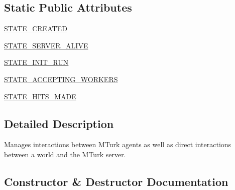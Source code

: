 \subsection*{Static Public Attributes}
\begin{DoxyCompactItemize}
\item 
\hyperlink{classparlai_1_1mturk_1_1core_1_1dev_1_1mturk__manager_1_1MTurkManager_a0f7a896e395e0201436504a28c3b2c59}{S\+T\+A\+T\+E\+\_\+\+C\+R\+E\+A\+T\+ED}
\item 
\hyperlink{classparlai_1_1mturk_1_1core_1_1dev_1_1mturk__manager_1_1MTurkManager_a3b27b3e98f420814dc7ef248839c053c}{S\+T\+A\+T\+E\+\_\+\+S\+E\+R\+V\+E\+R\+\_\+\+A\+L\+I\+VE}
\item 
\hyperlink{classparlai_1_1mturk_1_1core_1_1dev_1_1mturk__manager_1_1MTurkManager_a0e6f65be04d9a7cda6f58aa9fcbfc5f7}{S\+T\+A\+T\+E\+\_\+\+I\+N\+I\+T\+\_\+\+R\+UN}
\item 
\hyperlink{classparlai_1_1mturk_1_1core_1_1dev_1_1mturk__manager_1_1MTurkManager_ab9d7cb289b43380fa290778b41a54e55}{S\+T\+A\+T\+E\+\_\+\+A\+C\+C\+E\+P\+T\+I\+N\+G\+\_\+\+W\+O\+R\+K\+E\+RS}
\item 
\hyperlink{classparlai_1_1mturk_1_1core_1_1dev_1_1mturk__manager_1_1MTurkManager_a176ce171802f713cac46b2d5f64ba369}{S\+T\+A\+T\+E\+\_\+\+H\+I\+T\+S\+\_\+\+M\+A\+DE}
\end{DoxyCompactItemize}


\subsection{Detailed Description}
\begin{DoxyVerb}Manages interactions between MTurk agents as well as direct interactions between a
world and the MTurk server.
\end{DoxyVerb}
 

\subsection{Constructor \& Destructor Documentation}
\mbox{\label{classparlai_1_1mturk_1_1core_1_1dev_1_1mturk__manager_1_1MTurkManager_add88d49ae7a5b5ee28b83267eae0ac76}} 
